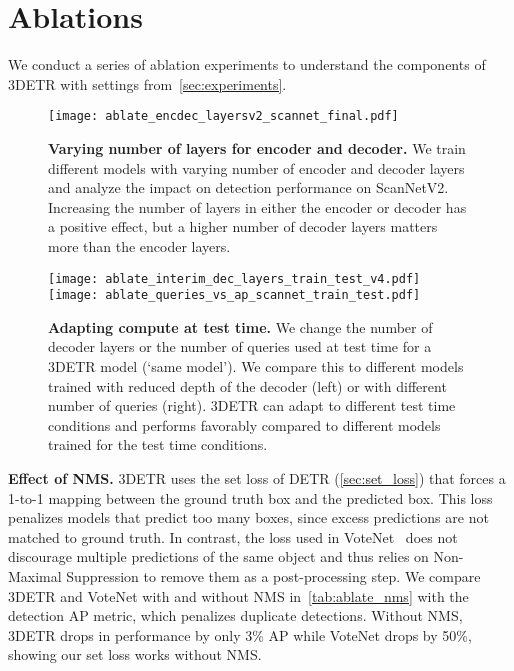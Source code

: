 \documentclass[10pt,twocolumn,letterpaper]{article}
\newcommand{\OURS}{3DETR\xspace}
\newcommand{\scannet}{ScanNetV2\xspace}
\begin{document}
\vspace{-0.05in}
\section{Ablations}
\label{sec:ablations}
\vspace{-0.05in}

We conduct a series of ablation experiments to understand the components of \OURS with settings from~\cref{sec:experiments}.













\begin{figure}[!t]
\texttt{[image: ablate\_encdec\_layersv2\_scannet\_final.pdf]}
\vspace{-0.2in}
\caption{\textbf{Varying number of layers for encoder and decoder.} 
We train different models with varying number of encoder and decoder layers and analyze the impact on detection performance on \scannet.
Increasing the number of layers in either the encoder or decoder has a positive effect, but a higher number of decoder layers matters more than the encoder layers.
}
\label{fig:enc_dec_layers}
\end{figure}


\begin{figure}[!t]
\centering

\texttt{[image: ablate\_interim\_dec\_layers\_train\_test\_v4.pdf]}
\texttt{[image: ablate\_queries\_vs\_ap\_scannet\_train\_test.pdf]}
\vspace{-0.15in}
\caption{\textbf{Adapting compute at test time.} 
We change the number of decoder layers or the number of queries used at test time for a \OURS model (`same model').
We compare this to different models trained with reduced depth of the decoder (left) or with different number of queries (right).
\OURS can adapt to different test time conditions and performs favorably compared to different models trained for the test time conditions.
}



\label{fig:dec_interim_queries}
\end{figure}

\vspace{0.05in}
\par \noindent \textbf{Effect of NMS.} 
\OURS uses the set loss of DETR (\cref{sec:set_loss}) that forces a 1-to-1 mapping between the ground truth box and the predicted box.
This loss penalizes models that predict too many boxes, since excess predictions are not matched to ground truth.
In contrast, the loss used in VoteNet~\cite{qi2019votenet} does not discourage multiple predictions of the same object and thus relies on Non-Maximal Suppression to remove them as a post-processing step.
We compare \OURS and VoteNet with and without NMS in~\cref{tab:ablate_nms} with the detection AP metric, which penalizes duplicate detections.
Without NMS, \OURS drops in performance by only 3\% AP while VoteNet drops by 50\%, showing our set loss works without NMS.
\end{document}
